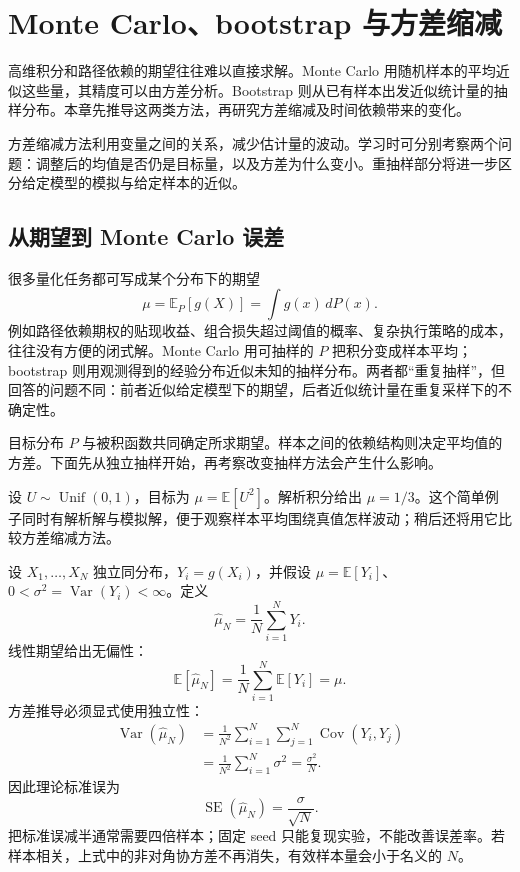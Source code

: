 \chapter{Monte Carlo、bootstrap 与方差缩减}
\label{ch:monte-carlo}

高维积分和路径依赖的期望往往难以直接求解。Monte Carlo 用随机样本的平均近似这些量，其精度可以由方差分析。Bootstrap 则从已有样本出发近似统计量的抽样分布。本章先推导这两类方法，再研究方差缩减及时间依赖带来的变化。

方差缩减方法利用变量之间的关系，减少估计量的波动。学习时可分别考察两个问题：调整后的均值是否仍是目标量，以及方差为什么变小。重抽样部分将进一步区分给定模型的模拟与给定样本的近似。

\section{从期望到 Monte Carlo 误差}

很多量化任务都可写成某个分布下的期望
\[
  \mu=\mathbb E_P[g(X)]=\int g(x)\,dP(x).
\]
例如路径依赖期权的贴现收益、组合损失超过阈值的概率、复杂执行策略的成本，往往没有方便的闭式解。Monte Carlo 用可抽样的 $P$ 把积分变成样本平均；bootstrap 则用观测得到的经验分布近似未知的抽样分布。两者都“重复抽样”，但回答的问题不同：前者近似给定模型下的期望，后者近似统计量在重复采样下的不确定性。

目标分布 $P$ 与被积函数共同确定所求期望。样本之间的依赖结构则决定平均值的方差。下面先从独立抽样开始，再考察改变抽样方法会产生什么影响。

\begin{example}
设 $U\sim\operatorname{Unif}(0,1)$，目标为 $\mu=\mathbb E[U^2]$。解析积分给出 $\mu=1/3$。这个简单例子同时有解析解与模拟解，便于观察样本平均围绕真值怎样波动；稍后还将用它比较方差缩减方法。
\end{example}


设 $X_1,\ldots,X_N$ 独立同分布，$Y_i=g(X_i)$，并假设
$\mu=\mathbb E[Y_i]$、$0<\sigma^2=\operatorname{Var}(Y_i)<\infty$。定义
\[
  \hat\mu_N=\frac1N\sum_{i=1}^N Y_i.
\]
线性期望给出无偏性：
\[
  \mathbb E[\hat\mu_N]
  =\frac1N\sum_{i=1}^N\mathbb E[Y_i]=\mu.
\]
方差推导必须显式使用独立性：
\[
\begin{aligned}
  \operatorname{Var}(\hat\mu_N)
  &=\frac1{N^2}\sum_{i=1}^N\sum_{j=1}^N
    \operatorname{Cov}(Y_i,Y_j)\\
  &=\frac1{N^2}\sum_{i=1}^N\sigma^2
   =\frac{\sigma^2}{N}.
\end{aligned}
\]
因此理论标准误为
\[
  \operatorname{SE}(\hat\mu_N)=\frac{\sigma}{\sqrt N}.
\]
把标准误减半通常需要四倍样本；固定 seed 只能复现实验，不能改善误差率。若样本相关，上式中的非对角协方差不再消失，有效样本量会小于名义的 $N$。

